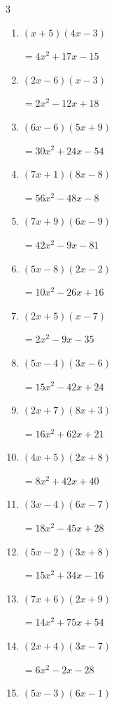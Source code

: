 \begin{multicols}{3}
\begin{enumerate}
        $=56x^{2}+34x-12$

\columnbreak %

  \item $(x+5)(4x-3)$

        $=4x^{2}+17x-15$

  \item $(2x-6)(x-3)$

        $=2x^{2}-12x+18$

  \item $(6x-6)(5x+9)$

        $=30x^{2}+24x-54$

  \item $(7x+1)(8x-8)$

        $=56x^{2}-48x-8$

  \item $(7x+9)(6x-9)$

        $=42x^{2}-9x-81$

  \item $(5x-8)(2x-2)$

        $=10x^{2}-26x+16$

  \item $(2x+5)(x-7)$

        $=2x^{2}-9x-35$

  \item $(5x-4)(3x-6)$

        $=15x^{2}-42x+24$

  \item $(2x+7)(8x+3)$

        $=16x^{2}+62x+21$

  \item $(4x+5)(2x+8)$

        $=8x^{2}+42x+40$

  \item $(3x-4)(6x-7)$

        $=18x^{2}-45x+28$

  \item $(5x-2)(3x+8)$

        $=15x^{2}+34x-16$

  \item $(7x+6)(2x+9)$

        $=14x^{2}+75x+54$

  \item $(2x+4)(3x-7)$

        $=6x^{2}-2x-28$

  \item $(5x-3)(6x-1)$


\end{enumerate}
\end{multicols}
